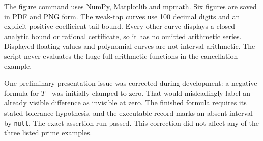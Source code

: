 The figure command uses NumPy, Matplotlib and mpmath. Six figures are
saved in PDF and PNG form. The weak-tap curves use 100 decimal digits
and an explicit positive-coefficient tail bound. Every other curve
displays a closed analytic bound or rational certificate, so it has no
omitted arithmetic series. Displayed floating values and polynomial
curves are not interval arithmetic. The script never evaluates the huge
full arithmetic functions in the cancellation example.

One preliminary presentation issue was corrected during development: a
negative formula for \(T_-\) was initially clamped to zero. That would
misleadingly label an already visible difference as invisible at zero.
The finished formula requires its stated tolerance hypothesis, and the
executable record marks an absent interval by \texttt{null}. The exact
assertion run passed. This correction did not affect any of the three
listed prime examples.
